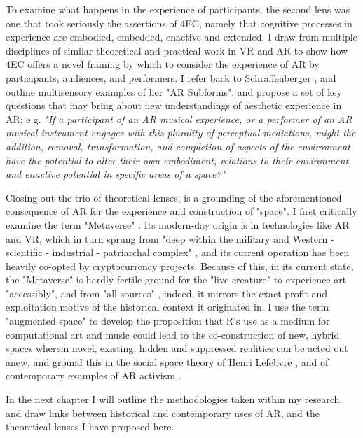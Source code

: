 To examine what happens in the experience of participants, the second lens was one that took seriously the assertions of 4EC, namely that cognitive processes in experience are embodied, embedded, enactive and extended. I draw from multiple disciplines of similar theoretical and practical work in VR and AR to show how 4EC offers a novel framing by which to consider the experience of AR by participants, audiences, and performers. I refer back to Schraffenberger \citeyearpar{schraffenberger2018}, and outline multisensory examples of her "AR Subforms", and propose a set of key questions that may bring about new understandings of aesthetic experience in AR; e.g. \textit{"If a participant of an AR musical experience, or a performer of an AR musical instrument engages with this plurality of perceptual mediations, might the addition, removal, transformation, and completion of aspects of the environment have the potential to alter their own embodiment, relations to their environment, and enactive potential in specific areas of a space?"}

Closing out the trio of theoretical lenses, is a grounding of the aforementioned consequence of AR for the experience and construction of "space". I first critically examine the term "Metaverse" \citep{stephenson1992}. Its modern-day origin is in technologies like AR and VR, which in turn sprung from "deep within the military and Western - scientific - industrial - patriarchal complex" \cite{davies2004}, and its current operation has been heavily co-opted by cryptocurrency projects. Because of this, in its current state, the "Metaverse" is hardly fertile ground for the "live creature" to experience art "accessibly", and from "all sources" \citep{dewey1934,leddy2021}, indeed, it mirrors the exact profit and exploitation motive of the historical context it originated in. I use the term "augmented space" \citep{manovich2006} to develop the proposition that R's use as a medium for computational art and music could lead to the co-construction of new, hybrid spaces wherein novel, existing, hidden and suppressed realities can be acted out anew, and ground this in the social space theory of Henri Lefebvre \citeyearpar{lefebvre1991}, and of contemporary examples of AR activism \citep{veenhof2010,thiel2011,thiel2018,skwarek2018}.

In the next chapter I will outline the methodologies taken within my research, and draw links between historical and contemporary uses of AR, and the theoretical lenses I have proposed here.